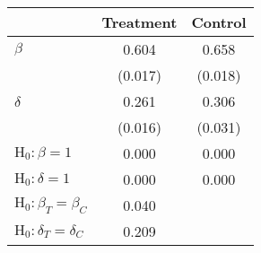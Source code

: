 {
\def\sym#1{\ifmmode^{#1}\else\(^{#1}\)\fi}
\begin{tabular}{l*{2}{c}}
\toprule
          &\multicolumn{1}{c}{Treatment}&\multicolumn{1}{c}{Control}\\
\midrule
\(\beta\) &    0.604&    0.658\\
          &  (0.017)&  (0.018)\\
\(\delta\)&    0.261&    0.306\\
          &  (0.016)&  (0.031)\\
\midrule \(\mathrm{H}_0: \beta = 1\)&    0.000&    0.000\\
\(\mathrm{H}_0: \delta = 1\)&    0.000&    0.000\\
\(\mathrm{H}_0: \beta_T = \beta_C\)&    0.040&         \\
\(\mathrm{H}_0: \delta_T = \delta_C\)&    0.209&         \\
\bottomrule
\end{tabular}
}
